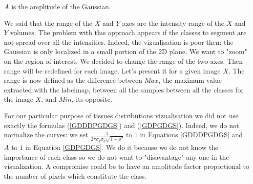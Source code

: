 $A$ is the amplitude of the Gaussian.
\par
We said that the range of the $X$ and $Y$ axes are the intensity range of the $X$ and $Y$ volumes. The problem with this approach appears if the classes to segment are not spread over all the intensities. Indeed, the vizualisation is poor then: the Gaussian is only localized in a small portion of the 2D plane. We want to "zoom" on the region of interest. We decided to change the range of the two axes. Then range will be redefined for each image. Let's present it for a given image $X$. The range is now defined as the difference between $Max$, the maximum value extracted with the labelmap, between all the samples between all the classes for the image $X$, and $Min$, its opposite.
\par
For our particular purpose of tissues distributions vizualisation we did not use exactly the formulas (\ref{GDDDPGDGS}) and (\ref{GDPGDGS}). Indeed, we do not normalize the curves: we set $\frac{1}{2 \pi \sigma_y \sigma_y \sqrt{1-\rho^2}}$ to $1$ in Equations \ref{GDDDPGDGS} and $A$ to $1$ in Equation \ref{GDPGDGS}. We do it because we do not know the importance of each class so we do not want to "disavantage" any one in the visualization. A compromise could be to have an amplitude factor proportional to the number of pixels which constitute the class.

